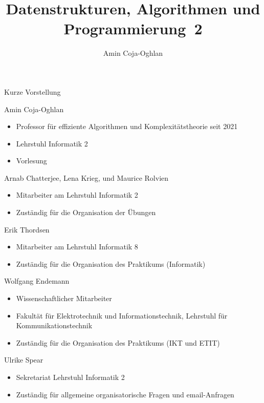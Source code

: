 \documentclass[aspectratio=1610, 11pt]{beamer}
\title{Datenstrukturen, Algorithmen und Programmierung~2}
\author[A.~Coja-Oghlan]{Amin Coja-Oghlan}
\institute[DAP2]{Lehrstuhl Informatik 2\\Fakult\"at f\"ur Informatik}
\begin{document}
\maketitle

\begin{frame}{Kurze Vorstellung}
	\begin{overprint}
		\begin{exampleblock}{Amin Coja-Oghlan}
		\begin{itemize}
			\item Professor f\"ur effiziente Algorithmen und Komplexit\"atstheorie seit 2021
			\item Lehrstuhl Informatik 2
			\item Vorlesung
		\end{itemize}
	\end{exampleblock}
	\begin{exampleblock}{Arnab Chatterjee, Lena Krieg, und Maurice Rolvien}
		\begin{itemize}
			\item Mitarbeiter am Lehrstuhl Informatik 2
			\item Zust\"andig f\"ur die Organisation der \"Ubungen
		\end{itemize}
	\end{exampleblock}
	\begin{exampleblock}{Erik Thordsen}
		\begin{itemize}
			\item Mitarbeiter am Lehrstuhl Informatik 8
			\item Zust\"andig f\"ur die Organisation des Praktikums (Informatik)
		\end{itemize}
	\end{exampleblock}
	\begin{exampleblock}{Wolfgang Endemann}
		\begin{itemize}
			\item Wissenschaftlicher Mitarbeiter
			\item Fakult\"at für Elektrotechnik und Informationstechnik, Lehrstuhl für Kommunikationstechnik
			\item Zust\"andig f\"ur die Organisation des Praktikums (IKT und ETIT)
		\end{itemize}
	\end{exampleblock}
	\begin{exampleblock}{Ulrike Spear}
		\begin{itemize}
			\item Sekretariat Lehrstuhl Informatik 2
			\item Zust\"andig f\"ur allgemeine organisatorische Fragen und email-Anfragen
		\end{itemize}
	\end{exampleblock}
	\end{overprint}
\end{frame}
\end{document}
